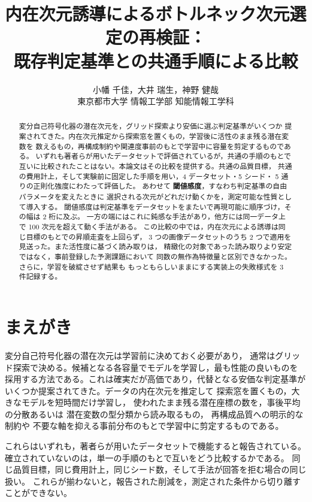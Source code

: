 \documentclass[11pt,a4paper]{jsarticle}
\title{内在次元誘導によるボトルネック次元選定の再検証：\\
既存判定基準との共通手順による比較}
\author{小幡 千佳，大井 瑞生，神野 健哉\\
東京都市大学 情報工学部 知能情報工学科}
\date{}
\begin{document}
\maketitle

\begin{abstract}
変分自己符号化器の潜在次元を，グリッド探索より安価に選ぶ判定基準がいくつか
提案されてきた。内在次元推定から探索窓を置くもの，学習後に活性のまま残る潜在変数を
数えるもの，再構成制約や関連度事前のもとで学習中に容量を剪定するものである。
いずれも著者らが用いたデータセットで評価されているが，共通の手順のもとで
互いに比較されたことはない。本論文はその比較を提供する。共通の品質目標，
共通の費用計上，そして実験前に固定した手順を用い，4 データセット・5 シード・
5 通りの正則化強度にわたって評価した。
あわせて \textbf{閾値感度}，すなわち判定基準の自由パラメータを変えたときに
選択される次元がどれだけ動くかを，測定可能な性質として導入する。
閾値感度は判定基準をデータセットをまたいで再現可能に順序づけ，その幅は 2 桁に及ぶ。
一方の端にはこれに鈍感な手法があり，他方には同一データ上で 100 次元を超えて動く手法がある。
この比較の中では，内在次元による誘導は同じ目標のもとでの昇順走査を上回らず，
3 つの画像データセットのうち 2 つで適用を見送った。また活性度に基づく読み取りは，
精緻化の対象であった読み取りより安定ではなく，事前登録した予測課題において
同数の無作為特徴量と区別できなかった。さらに，学習を破綻させず結果も
もっともらしいままにする実装上の失敗様式を 3 件記録する。
\end{abstract}

\section{まえがき}\label{sec:intro}

変分自己符号化器\cite{kingma2014vae}の潜在次元は学習前に決めておく必要があり，
通常はグリッド探索で決める。候補となる各容量でモデルを学習し，最も性能の良いものを
採用する方法である。これは確実だが高価であり，代替となる安価な判定基準が
いくつか提案されてきた。データの内在次元を推定\cite{facco2017twonn,levina2005mle}して
探索窓を置くもの\cite{bonheme2022fondue}，大きなモデルを短時間だけ学習し，
使われたまま残る潜在座標の数を，事後平均の分散\cite{burda2016iwae}あるいは
潜在変数の型分類\cite{bonheme2023active}から読み取るもの，
再構成品質への明示的な制約\cite{deboom2020geco}や
不要な軸を抑える事前分布\cite{saha2025ardvae}のもとで学習中に剪定するものである。

これらはいずれも，著者らが用いたデータセットで機能すると報告されている。
確立されていないのは，単一の手順のもとで互いをどう比較するかである。
同じ品質目標，同じ費用計上，同じシード数，そして手法が回答を拒む場合の同じ扱い。
これらが揃わないと，報告された削減を，測定された条件から切り離すことができない。
\end{document}

